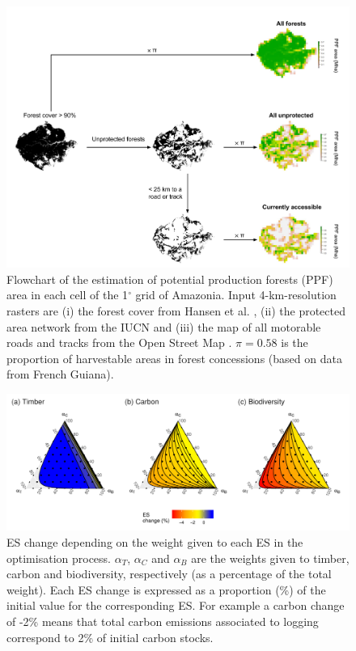 \documentclass[12pt]{article}
\begin{document}
\begin{figure}
    \centering
    \includegraphics[width=\linewidth]{graphs/PPFareaDiagram.pdf}
    \caption{Flowchart of the estimation of potential production forests (PPF) area in each cell of the 1$^{\circ}$ grid of Amazonia. Input 4-km-resolution rasters are (i) the forest cover from Hansen et al. \cite{Hansen2013}, (ii) the protected area network from the IUCN \cite{WDPA2016} and (iii) the map of all motorable roads and tracks from the Open Street Map \cite{OSM2018}. $\pi = 0.58$ is the proportion of harvestable areas in forest concessions (based on data from French Guiana). }
    \label{fig:ppfDiagram}
\end{figure}

\clearpage


\begin{figure}
    \centering
    \includegraphics[width=\textwidth]{graphs/changingESweights.pdf}
    \caption{ES change depending on the weight given to each ES in the optimisation process. $\alpha_T$, $\alpha_C$ and $\alpha_B$ are the weights given to timber, carbon and biodiversity, respectively (as a percentage of the total weight). Each ES change is expressed as a proportion (\%) of the initial value for the corresponding ES. For example a carbon change of -2\% means that total carbon emissions associated to logging correspond to 2\% of initial carbon stocks.} 
    \label{fig:changeCosts}
\end{figure}
\end{document}
